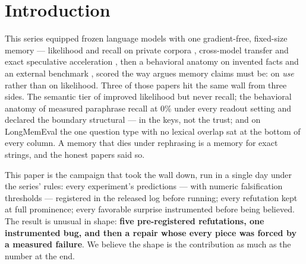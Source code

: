 \documentclass[11pt]{article}
\begin{document}
\section{Introduction}

This series equipped frozen language models with one gradient-free, fixed-size memory --- likelihood and recall on private corpora \cite{sillage,router,hier,fw}, cross-model transfer and exact speculative acceleration \cite{drafter}, then a behavioral anatomy on invented facts \cite{behavior} and an external benchmark \cite{bench}, scored the way \cite{beyondppl} argues memory claims must be: on \emph{use} rather than on likelihood. Three of those papers hit the same wall from three sides. The semantic tier of \cite{router} improved likelihood but never recall; the behavioral anatomy of \cite{behavior} measured paraphrase recall at 0\% under every readout setting and declared the boundary structural --- in the keys, not the trust; and on LongMemEval \cite{bench} the one question type with no lexical overlap sat at the bottom of every column. A memory that dies under rephrasing is a memory for exact strings, and the honest papers said so.

This paper is the campaign that took the wall down, run in a single day under the series' rules: every experiment's predictions --- with numeric falsification thresholds --- registered in the released log before running; every refutation kept at full prominence; every favorable surprise instrumented before being believed. The result is unusual in shape: \textbf{five pre-registered refutations, one instrumented bug, and then a repair whose every piece was forced by a measured failure}. We believe the shape is the contribution as much as the number at the end.
\end{document}
